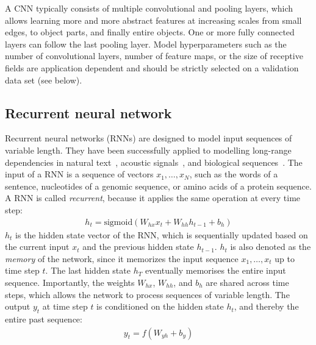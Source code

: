 A CNN typically consists of multiple convolutional and pooling layers, which allows learning more and more abstract features at increasing scales from small edges, to object parts, and finally entire objects. One or more fully connected layers can follow the last pooling layer. Model hyperparameters such as the number of convolutional layers, number of feature maps, or the size of receptive fields are application dependent and should be strictly selected on a validation data set (see below).


\subsection{Recurrent neural network} \label{sec:dl_rnn}

Recurrent neural networks (RNNs) are designed to model input sequences of variable length. They have been successfully applied to modelling long-range dependencies in natural text~\citep{sutskever_sequence_2014,bahdanau_neural_2014,xiong_dynamic_2016}, acoustic signals~\citep{deng_deep_2015,graves_speech_2013,hinton_deep_2012}, and biological sequences~\citep{agathocleous_protein_2010,sonderby_protein_2014,li_protein_2016,quang_danq:_2016}.  The input of a RNN is a sequence of vectors $x_1,\ldots,x_N$, such as the words of a sentence, nucleotides of a genomic sequence, or amino acids of a protein sequence. A RNN is called \emph{recurrent}, because it applies the same operation at every time step:
\begin{align}
  h_t=\textrm{sigmoid}(W_{hx}x_t+W_{hh}h_{t-1}+b_h)
\end{align}
$h_t$ is the hidden state vector of the RNN, which is sequentially updated based on the current input $x_t$ and the previous hidden state $h_{t-1}$. $h_t$ is also denoted as the \emph{memory} of the network, since it memorizes the input sequence $x_1,\ldots,x_t$ up to time step $t$. The last hidden state $h_T$ eventually memorises the entire input sequence. Importantly, the weights $W_{hx}$, $W_{hh}$, and $b_h$ are shared across time steps, which allows the network to process sequences of variable length. The output $y_t$ at time step $t$ is conditioned on the hidden state $h_t$, and thereby the entire past sequence:
\begin{align}
  y_t=f(W_{yh}+b_y)
\end{align}
